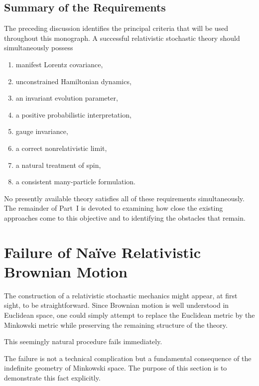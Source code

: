 \subsection{Summary of the Requirements}

The preceding discussion identifies the principal criteria that will be
used throughout this monograph.
A successful relativistic stochastic theory should simultaneously
possess
\begin{enumerate}
\item manifest Lorentz covariance,
\item unconstrained Hamiltonian dynamics,
\item an invariant evolution parameter,
\item a positive probabilistic interpretation,
\item gauge invariance,
\item a correct nonrelativistic limit,
\item a natural treatment of spin,
\item a consistent many-particle formulation.
\end{enumerate}
No presently available theory satisfies all of these requirements
simultaneously. The remainder of Part~I is devoted to examining how
close the existing approaches come to this objective and to identifying
the obstacles that remain.
\section{Failure of Na\"ive Relativistic Brownian Motion}

The construction of a relativistic stochastic mechanics might appear, at
first sight, to be straightforward. Since Brownian motion is well
understood in Euclidean space, one could simply attempt to replace the
Euclidean metric by the Minkowski metric while preserving the remaining
structure of the theory.

This seemingly natural procedure fails immediately.

The failure is not a technical complication but a fundamental
consequence of the indefinite geometry of Minkowski space. The purpose of
this section is to demonstrate this fact explicitly.

